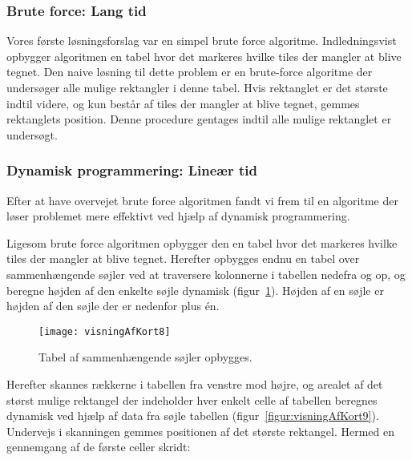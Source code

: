 \subsubsection{Brute force: Lang tid}
\label{subsec:bruteForce}

Vores første løsningsforslag var en simpel brute force algoritme. Indledningsvist opbygger algoritmen en tabel hvor det markeres hvilke tiles der mangler at blive tegnet. Den naive løsning til dette problem er en brute-force algoritme der undersøger alle mulige rektangler i denne tabel. Hvis rektanglet er det største indtil videre, og kun består af tiles der mangler at blive tegnet, gemmes rektanglets position. Denne procedure gentages indtil alle mulige rektanglet er undersøgt.

\subsubsection{Dynamisk programmering: Lineær tid}
\label{subsec:dynamiskProgrammering}

Efter at have overvejet brute force algoritmen fandt vi frem til en algoritme der løser problemet mere effektivt ved hjælp af dynamisk programmering. 

Ligesom brute force algoritmen opbygger den en tabel hvor det markeres hvilke tiles der mangler at blive tegnet. Herefter opbygges endnu en tabel over sammenhængende søjler ved at traversere kolonnerne i tabellen nedefra og op, og beregne højden af den enkelte søjle dynamisk (figur~\ref{figur:visningAfKort8}). Højden af en søjle er højden af den søjle der er nedenfor plus én.

\begin{figure}[h]
	\centering
	\texttt{[image: visningAfKort8]}
	\captionsetup{width=0.8\textwidth}
	\caption{Tabel af sammenhængende søjler opbygges.}
	\label{figur:visningAfKort8}
\end{figure}

Herefter skannes rækkerne i tabellen fra venstre mod højre, og arealet af det størst mulige rektangel der indeholder hver enkelt celle af tabellen beregnes dynamisk ved hjælp af data fra søjle tabellen (figur~\ref{figur:visningAfKort9}). Undervejs i skanningen gemmes positionen af det største rektangel. Hermed en gennemgang af de første celler skridt:

